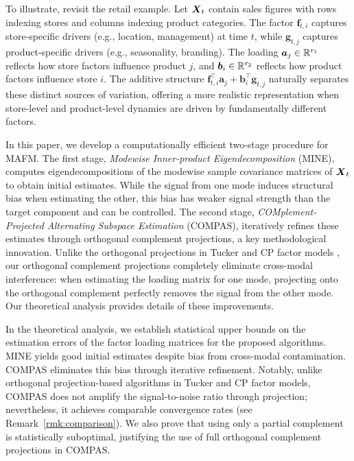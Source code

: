 \documentclass[11pt,letterpaper]{article}
\newcommand{\bfm}[1]{\ensuremath{\boldsymbol{#1}}} %
\def\ba{\bfm a}   \def\bA{\bfm A}  \def\AA{\mathbb{A}}
\def\bb{\bfm b}   \def\bB{\bfm B}  \def\BB{\mathbb{B}}
\def\bg{\bfm g}   \def\bG{\bfm G}  \def\GG{\mathbb{G}}
\theoremstyle{definition}
\newcommand{\bfv}{\mathbf{f}}
\begin{document}
To illustrate, revisit the retail example. Let $\bX_t$ contain sales figures with rows indexing stores and columns indexing product categories. The factor $\bfv_{t, i}$ captures store-specific drivers (e.g., location, management) at time $t$, while $\bg_{t,j}$ captures product-specific drivers (e.g., seasonality, branding). The loading $\ba_j \in \RR^{r_1}$ reflects how store factors influence product $j$, and $\bb_i \in \RR^{r_2}$ reflects how product factors influence store $i$. The additive structure $\bfv_{t,i}^\top \ba_j + \bb_i^\top \bg_{t,j}$ naturally separates these distinct sources of variation, offering a more realistic representation when store-level and product-level dynamics are driven by fundamentally different factors. 


In this paper, we develop a computationally efficient two-stage procedure for MAFM. The first stage, \emph{Modewise Inner-product Eigendecomposition} (MINE), computes eigendecompositions of the modewise sample covariance matrices of $\bX_t$ to obtain initial estimates. While the signal from one mode induces structural bias when estimating the other, this bias has weaker signal strength than the target component and can be controlled. The second stage, \emph{COMplement-Projected Alternating Subspace Estimation} (COMPAS), iteratively refines these estimates through orthogonal complement projections, a key methodological innovation. Unlike the orthogonal projections in Tucker and CP factor models \citep{han2024tensor, han2024cp}, our orthogonal complement projections completely eliminate cross-modal interference: when estimating the loading matrix for one mode, projecting onto the orthogonal complement perfectly removes the signal from the other mode. Our theoretical analysis provides details of these improvements.


In the theoretical analysis, we establish statistical upper bounds on the estimation errors of the factor loading matrices for the proposed algorithms. MINE yields good initial estimates despite bias from cross-modal contamination. COMPAS eliminates this bias through iterative refinement. Notably, unlike orthogonal projection-based algorithms in Tucker and CP factor models, COMPAS does not amplify the signal-to-noise ratio through projection; nevertheless, it achieves comparable convergence rates (see Remark~\ref{rmk:comparison}). We also prove that using only a partial complement is statistically suboptimal, justifying the use of full orthogonal complement projections in COMPAS.
\end{document}
